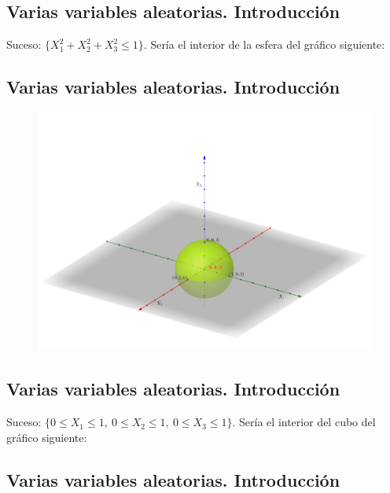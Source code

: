 \documentclass[]{book}
\begin{document}
\hypertarget{varias-variables-aleatorias.-introducciuxf3n-1}{%
\subsection{Varias variables aleatorias. Introducción}\label{varias-variables-aleatorias.-introducciuxf3n-1}}

Suceso: \(\{X_1^2+X_2^2+X_3^2\leq 1\}\). Sería el interior de la esfera del gráfico siguiente:

\hypertarget{varias-variables-aleatorias.-introducciuxf3n-2}{%
\subsection{Varias variables aleatorias. Introducción}\label{varias-variables-aleatorias.-introducciuxf3n-2}}

\begin{figure}
\includegraphics[width=750px]{Images/EjEsfera3D} \end{figure}

\hypertarget{varias-variables-aleatorias.-introducciuxf3n-3}{%
\subsection{Varias variables aleatorias. Introducción}\label{varias-variables-aleatorias.-introducciuxf3n-3}}

Suceso: \(\{0\leq X_1\leq 1,\ 0\leq X_2\leq 1,\ 0\leq X_3\leq 1\}\). Sería el interior del cubo del gráfico siguiente:

\hypertarget{varias-variables-aleatorias.-introducciuxf3n-4}{%
\subsection{Varias variables aleatorias. Introducción}\label{varias-variables-aleatorias.-introducciuxf3n-4}}
\end{document}
